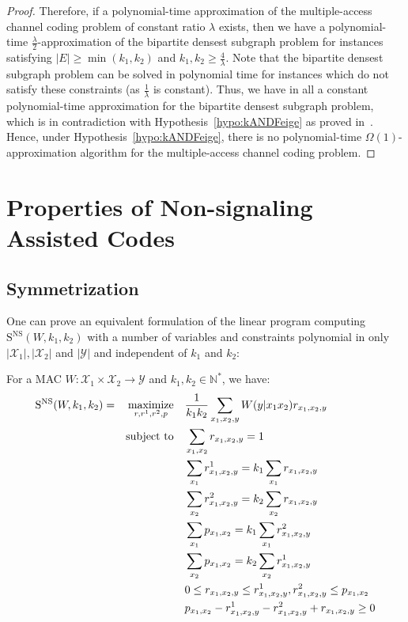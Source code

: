 \begin{proof}
Therefore, if a polynomial-time approximation of the multiple-access channel coding problem of constant ratio $\lambda$ exists, then we have a polynomial-time $\frac{\lambda}{2}$-approximation of the bipartite densest subgraph problem for instances satisfying $|E| \geq \min(k_1,k_2)$ and $k_1,k_2 \geq \frac{4}{\lambda}$. Note that the bipartite densest subgraph problem can be solved in polynomial time for instances which do not satisfy these constraints (as $\frac{1}{\lambda}$ is constant). Thus, we have in all a constant polynomial-time approximation for the bipartite densest subgraph problem, which is in contradiction with Hypothesis~\ref{hypo:kANDFeige} as proved in~\cite{AAMMW11}. Hence, under Hypothesis~\ref{hypo:kANDFeige}, there is no polynomial-time $\Omega(1)$-approximation algorithm for the multiple-access channel coding problem.
\end{proof}

\section{Properties of Non-signaling Assisted Codes}
\label{section:complexity}
\subsection{Symmetrization}
One can prove an equivalent formulation of the linear program computing $\mathrm{S}^{\mathrm{NS}}(W,k_1,k_2)$ with a number of variables and constraints polynomial in only $|\mathcal{X}_1|,|\mathcal{X}_2|$ and $|\mathcal{Y}|$ and independent of $k_1$ and $k_2$:
\begin{proposition}
  \label{prop:NSLP}
  For a MAC $W: \mathcal{X}_1 \times \mathcal{X}_2 \rightarrow \mathcal{Y}$ and $k_1,k_2 \in \mathbb{N}^*$, we have:
  \begin{equation}
  \begin{aligned}
    \mathrm{S}^{\mathrm{NS}}(W,k_1,k_2) = &&\underset{r,r^1,r^2,p}{\operatorname{\text{maximize}}} &&& \frac{1}{k_1k_2} \sum_{x_1,x_2,y} W(y|x_1x_2)r_{x_1,x_2,y}\\
    &&\operatorname{\text{subject to}} &&& \sum_{x_1,x_2} r_{x_1,x_2,y} = 1\\
    &&&&& \sum_{x_1} r^1_{x_1,x_2,y} = k_1 \sum_{x_1} r_{x_1,x_2,y}\\
    &&&&& \sum_{x_2} r^2_{x_1,x_2,y} = k_2 \sum_{x_2} r_{x_1,x_2,y}\\
    &&&&& \sum_{x_1} p_{x_1,x_2} = k_1 \sum_{x_1} r^2_{x_1,x_2,y}\\
    &&&&& \sum_{x_2} p_{x_1,x_2} = k_2 \sum_{x_2} r^1_{x_1,x_2,y}\\
    &&&&& 0 \leq r_{x_1,x_2,y} \leq r^1_{x_1,x_2,y},r^2_{x_1,x_2,y} \leq p_{x_1,x_2}\\
    &&&&& p_{x_1,x_2} -  r^1_{x_1,x_2,y} - r^2_{x_1,x_2,y} + r_{x_1,x_2,y} \geq 0
  \end{aligned}
  \end{equation}

\end{proposition}


